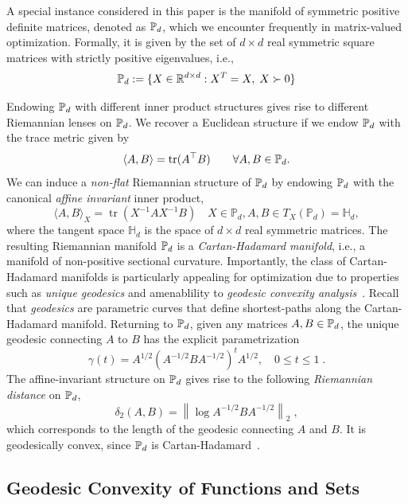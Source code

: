 \documentclass[twoside,11pt]{article}
\begin{document}
A special instance considered in this paper is the manifold of symmetric positive definite matrices, denoted as $\mathbb{P}_d$, which we encounter frequently in matrix-valued optimization. Formally, it is given by the set of $d \times d$ real symmetric square matrices with strictly positive eigenvalues, i.e., 
\begin{equation*}
    \mathbb{P}_d := \{ X \in \mathbb{R}^{d\times d}: X^T=X, \; X \succ 0 \}
\end{equation*}

Endowing $\mathbb{P}_d$ with different inner product structures gives rise to different Riemannian lenses on $\mathbb{P}_d$. We recover a Euclidean structure if we endow $\mathbb{P}_d$ with the trace metric given by 
\[
\langle A, B \rangle = \text{tr}(A^\top B) \qquad \forall A,B \in \mathbb{P}_d.
\]
We can induce a \textit{non-flat} Riemannian structure of $\mathbb{P}_d$ by endowing $\mathbb{P}_d$ with the canonical \textit{affine invariant} inner product, 
\[\langle A, B\rangle_X=\operatorname{tr}\left(X^{-1} A X^{-1} B\right) \quad X \in \mathbb{P}_d, A, B \in T_X\left(\mathbb{P}_d\right)=\mathbb{H}_d,\]
where the tangent space $\mathbb{H}_d$ is the space of $d\times d$ real symmetric matrices. The resulting Riemannian manifold $\mathbb{P}_d$ is a \emph{Cartan-Hadamard manifold}, i.e., a manifold of non-positive sectional curvature. Importantly, the class of Cartan-Hadamard manifolds is particularly appealing for optimization due to properties such as \textit{unique geodesics} and amenablility to \textit{geodesic convexity analysis}~\citep{bacak2014convex}. 
Recall that \emph{geodesics} are parametric curves that define shortest-paths along the Cartan-Hadamard manifold. Returning to $\mathbb{P}_d$, given any matrices $A,B \in \mathbb{P}_d$, the unique geodesic connecting $A$ to $B$ has the explicit parametrization
\begin{equation}\label{eq:intro_gcvx_def}
    \gamma(t)=A^{1 / 2}\left(A^{-1 / 2} B A^{-1 / 2}\right)^t A^{1 / 2}, \quad 0 \leq t \leq 1 \; .
\end{equation}
The affine-invariant structure on $\mathbb{P}_d$ gives rise to the following \textit{Riemannian distance} on $\mathbb{P}_d$, 
\[
\delta_2(A, B)=\left\|\log A^{-1 / 2} B A^{-1 / 2}\right\|_2 \; ,
\]
which corresponds to the length of the geodesic connecting $A$ and $B$. It is geodesically convex, since $\mathbb{P}_d$ is Cartan-Hadamard~\citep{bacak2014convex, bhatia07positivedefinitematrices}.




\subsection{Geodesic Convexity of Functions and Sets}
\end{document}
